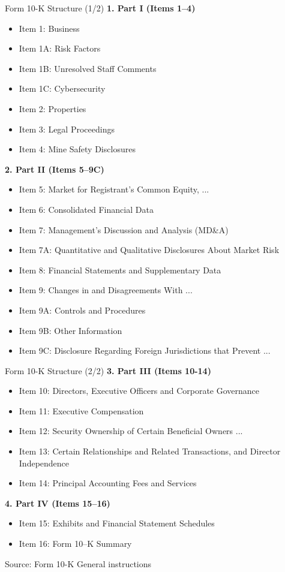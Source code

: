 \documentclass{beamer}
\begin{document}
\begin{frame}{Form 10-K Structure (1/2)}
\textbf{1. Part I (Items 1–4)}
\begin{itemize}
\item Item 1: Business
\item Item 1A: Risk Factors
\item Item 1B: Unresolved Staff Comments
\item Item 1C: Cybersecurity
\item Item 2: Properties
\item Item 3: Legal Proceedings
\item Item 4: Mine Safety Disclosures
\end{itemize}

\textbf{2. Part II (Items 5–9C)}
\begin{itemize}
\item Item 5: Market for Registrant's Common Equity, ...
\item Item 6: Consolidated Financial Data
\item Item 7: Management's Discussion and Analysis (MD\&A)
\item Item 7A: Quantitative and Qualitative Disclosures About Market Risk
\item Item 8: Financial Statements and Supplementary Data
\item Item 9: Changes in and Disagreements With ...
\item Item 9A: Controls and Procedures
\item Item 9B: Other Information
\item Item 9C: Disclosure Regarding Foreign Jurisdictions that Prevent ...
\end{itemize}
\end{frame}

\begin{frame}{Form 10-K Structure (2/2)}
\textbf{3. Part III (Items 10-14)}
\begin{itemize}
\item Item 10: Directors, Executive Officers and Corporate Governance
\item Item 11: Executive Compensation
\item Item 12: Security Ownership of Certain Beneficial Owners ...
\item Item 13: Certain Relationships and Related Transactions, and Director Independence
\item Item 14: Principal Accounting Fees and Services
\end{itemize}

\textbf{4. Part IV (Items 15–16)}
\begin{itemize}
\item Item 15: Exhibits and Financial Statement Schedules
\item Item 16: Form 10–K Summary
\end{itemize}

\vspace{0.5cm}
\footnotesize{Source: Form 10-K General instructions}
\end{frame}
\end{document}
